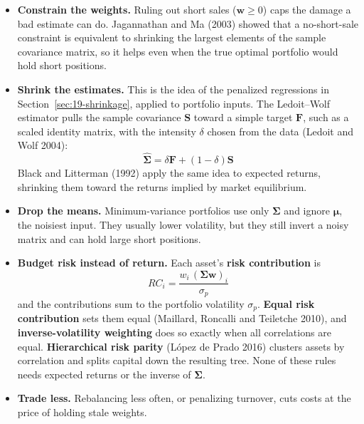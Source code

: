 \begin{itemize}
  \item \textbf{Constrain the weights.} Ruling out short sales ($\mathbf{w} \geq 0$) caps the damage a bad estimate can do. Jagannathan and Ma (2003) showed that a no-short-sale constraint is equivalent to shrinking the largest elements of the sample covariance matrix, so it helps even when the true optimal portfolio would hold short positions.
  \item \textbf{Shrink the estimates.} This is the idea of the penalized regressions in Section~\ref{sec:19-shrinkage}, applied to portfolio inputs. The Ledoit--Wolf estimator pulls the sample covariance $\mathbf{S}$ toward a simple target $\mathbf{F}$, such as a scaled identity matrix, with the intensity $\delta$ chosen from the data (Ledoit and Wolf 2004):
  \begin{equation}
    \hat{\boldsymbol{\Sigma}} = \delta\mathbf{F} + (1 - \delta)\mathbf{S}
    \label{eq:12-shrink}
  \end{equation}
  Black and Litterman (1992) apply the same idea to expected returns, shrinking them toward the returns implied by market equilibrium.
  \item \textbf{Drop the means.} Minimum-variance portfolios use only $\boldsymbol{\Sigma}$ and ignore $\boldsymbol{\mu}$, the noisiest input. They usually lower volatility, but they still invert a noisy matrix and can hold large short positions.
  \item \textbf{Budget risk instead of return.} Each asset's \textbf{risk contribution} is
  \begin{equation}
    RC_i = \frac{w_i\,(\boldsymbol{\Sigma}\mathbf{w})_i}{\sigma_p}
    \label{eq:12-rc}
  \end{equation}
  and the contributions sum to the portfolio volatility $\sigma_p$. \textbf{Equal risk contribution} sets them equal (Maillard, Roncalli and Teiletche 2010), and \textbf{inverse-volatility weighting} does so exactly when all correlations are equal. \textbf{Hierarchical risk parity} (L\'opez de Prado 2016) clusters assets by correlation and splits capital down the resulting tree. None of these rules needs expected returns or the inverse of $\boldsymbol{\Sigma}$.
  \item \textbf{Trade less.} Rebalancing less often, or penalizing turnover, cuts costs at the price of holding stale weights.
\end{itemize}

